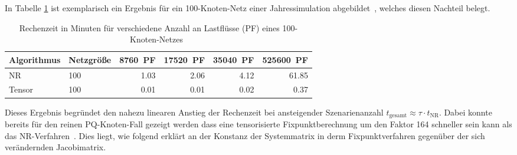 
In Tabelle \ref{tab:nr_vergleich} ist exemplarisch ein Ergebnis für ein 100-Knoten-Netz einer Jahressimulation abgebildet~\cite{Salazar2024}, welches diesen Nachteil belegt. 
\begin{table}[H]
	\centering
	\caption{Rechenzeit in Minuten für verschiedene Anzahl an Lastflüsse (PF) eines 100-Knoten-Netzes~\cite{Salazar2024}}
	\label{tab:nr_vergleich}
\begin{tabular}{llrrrr}
	\toprule
	Algorithmus & Netzgröße &
	\SI{8760}{PF} &
	\SI{17520}{PF} &
	\SI{35040}{PF} &
	\SI{525600}{PF} \\
	\midrule
	NR
	& 100
	& 1.03
	& 2.06
	& 4.12
	& 61.85 \\
	
	Tensor
	& 100
	& 0.01
	& 0.01
	& 0.02
	& 0.37 \\

	\bottomrule
\end{tabular}
\end{table}

Dieses Ergebnis begründet den nahezu linearen Anstieg der Rechenzeit bei ansteigender Szenarienanzahl $t_{\text{gesamt}} \approx \tau \cdot t_{\text{NR}}$.
Dabei konnte bereits für den reinen PQ-Knoten-Fall gezeigt werden dass eine tensorisierte Fixpunktberechnung um den Faktor 164 schneller sein kann als das NR-Verfahren~\cite{Salazar2024}. Dies liegt, wie folgend erklärt an der Konstanz der Systemmatrix in derm Fixpunktverfahren gegenüber der sich verändernden Jacobimatrix.

\bigskip
\noindent



